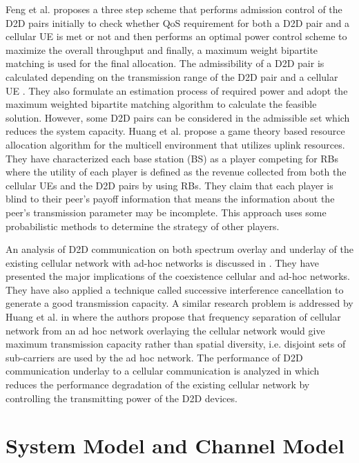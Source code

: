\documentclass[times]{dacauth}
\begin{document}
\noindent
Feng et al. \cite{feng} proposes a three step scheme that performs admission control of the D2D pairs initially to check whether QoS requirement for both a D2D pair and a cellular UE is met or not and then performs an optimal power control scheme to maximize the overall throughput and finally, a maximum weight bipartite matching is used for the final allocation. The admissibility of a D2D pair is calculated depending on the transmission range of the D2D pair and a cellular UE . They also formulate an estimation process of required power and adopt the maximum weighted bipartite matching algorithm to calculate the feasible solution. However, some D2D pairs can be considered in the admissible set which reduces the system capacity. Huang et al. \cite{huang_game} propose a game theory based resource allocation algorithm for the multicell environment that utilizes uplink resources. They have characterized each base station (BS) as a player competing for RBs where the utility of each player is defined as the revenue collected from both the cellular UEs and the D2D pairs by using RBs. They claim that each player is blind to their peer's payoff information that means the information about the peer's transmission parameter may be incomplete. This approach uses some probabilistic methods to determine the strategy of other players.

\smallskip
\noindent
An analysis of D2D communication on both spectrum overlay and underlay of the existing cellular network with ad-hoc networks is discussed in \cite{huang}. They have presented the major implications of the coexistence cellular and ad-hoc networks. They have also applied a technique called successive interference cancellation to generate a good transmission capacity. A similar research problem is addressed by Huang et al. in \cite{overlaid} where the authors propose that frequency separation of cellular network from an ad hoc network overlaying the cellular network would give maximum transmission capacity rather than spatial diversity, i.e. disjoint sets of sub-carriers are used by the ad hoc network. The performance of D2D communication underlay to a cellular communication is analyzed in \cite{yu} which reduces the performance degradation of the existing cellular network by controlling the transmitting power of the D2D devices. 



\section{System Model and Channel Model}\label{section:System and Channel Model}
\end{document}
